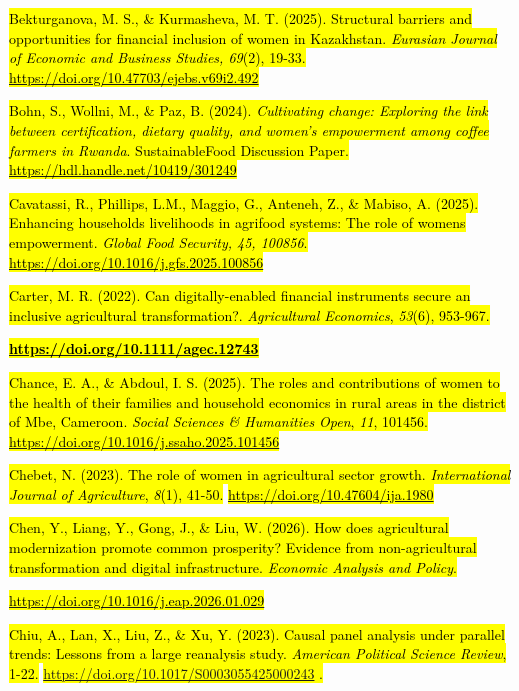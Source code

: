 \documentclass[
]{article}
\begin{document}
\hl{Bekturganova, M. S., \& Kurmasheva, M. T. (2025). Structural
barriers and opportunities for financial inclusion of women in
Kazakhstan. \emph{Eurasian Journal of Economic and Business Studies,
69}(2), 19-33.}
\href{https://doi.org/10.47703/ejebs.v69i2.492}{\hl{https://doi.org/10.47703/ejebs.v69i2.492}}

\hl{Bohn, S., Wollni, M., \& Paz, B. (2024). \emph{Cultivating change:
Exploring the link between certification, dietary quality, and women's
empowerment among coffee farmers in Rwanda}. SustainableFood Discussion
Paper.}
\href{https://hdl.handle.net/10419/301249}{\hl{https://hdl.handle.net/10419/301249}}

\hl{Cavatassi, R., Phillips, L.M., Maggio, G., Anteneh, Z., \& Mabiso,
A. (2025). Enhancing households\textquotesingle{} livelihoods in
agrifood systems: The role of women\textquotesingle s empowerment.
\emph{Global Food Security, 45, 100856}.}
\href{https://doi.org/10.1016/j.gfs.2025.100856}{\hl{https://doi.org/10.1016/j.gfs.2025.100856}}

\hl{Carter, M. R. (2022). Can digitally-enabled financial instruments
secure an inclusive agricultural transformation?. \emph{Agricultural
Economics}, \emph{53}(6), 953-967.}

\href{https://doi.org/10.1111/agec.12743}{\textbf{\hl{https://doi.org/10.1111/agec.12743}}}

\hl{Chance, E. A., \& Abdoul, I. S. (2025). The roles and contributions
of women to the health of their families and household economics in
rural areas in the district of Mbe, Cameroon. \emph{Social Sciences \&
Humanities Open}, \emph{11}, 101456.}
\href{https://doi.org/10.1016/j.ssaho.2025.101456}{\hl{https://doi.org/10.1016/j.ssaho.2025.101456}}

\hl{Chebet, N. (2023). The role of women in agricultural sector growth.
\emph{International Journal of Agriculture}, \emph{8}(1), 41-50.}
\href{https://doi.org/10.47604/ija.1980}{\hl{https://doi.org/10.47604/ija.1980}}

\hl{Chen, Y., Liang, Y., Gong, J., \& Liu, W. (2026). How does
agricultural modernization promote common prosperity? Evidence from
non-agricultural transformation and digital infrastructure.
\emph{Economic Analysis and Policy}.}

\href{https://doi.org/10.1016/j.eap.2026.01.029}{\hl{https://doi.org/10.1016/j.eap.2026.01.029}}

\hl{Chiu, A., Lan, X., Liu, Z., \& Xu, Y. (2023). Causal panel analysis
under parallel trends: Lessons from a large reanalysis study.
\emph{American Political Science Review}, 1-22.}
\hl{\mbox{\url{https://doi.org/10.1017/S0003055425000243}} .}
\end{document}
